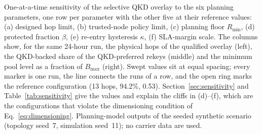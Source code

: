 One-at-a-time sensitivity of the selective QKD overlay to the six planning
parameters, one row per parameter with the other five at their reference
values: (a) designed hop limit, (b) trusted-node policy limit, (c) planning
floor $R_{\min}$, (d) protected fraction $\beta$, (e) re-entry hysteresis
$\kappa$, (f) SLA-margin scale. The columns show, for the same 24-hour run,
the physical hops of the qualified overlay (left), the QKD-backed share of
the QKD-preferred rekeys (middle) and the minimum pool level as a fraction of
$B_{\max}$ (right). Swept values sit at equal spacing; every marker is one
run, the line connects the runs of a row, and the open ring marks the
reference configuration (13 hops, 94.2\%, 0.53).
Section~\ref{sec:sensitivity} and Table~\ref{tab:sensitivity} give the
values and explain the cliffs in (d)--(f), which are the configurations that
violate the dimensioning condition of Eq.~\eqref{eq:dimensioning}.
Planning-model outputs of the seeded synthetic scenario (topology seed~7,
simulation seed~11); no carrier data are used.
